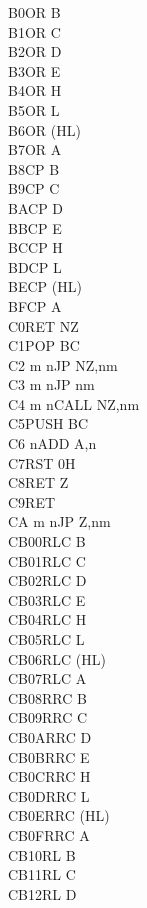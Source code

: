 \begin{multicols}{3}
{\begin{tabbing}
    B0\>OR B\\
    B1\>OR C\\
    B2\>OR D\\
    B3\>OR E\\
    B4\>OR H\\
    B5\>OR L\\
    B6\>OR (HL)\\
    B7\>OR A\\
    B8\>CP B\\
    B9\>CP C\\
    BA\>CP D\\
    BB\>CP E\\
    BC\>CP H\\
    BD\>CP L\\
    BE\>CP (HL)\\
    BF\>CP A\\
    C0\>RET NZ\\
    C1\>POP BC\\
    C2 m n\>JP NZ,nm\\
    C3 m n\>JP nm\\
    C4 m n\>CALL NZ,nm\\
    C5\>PUSH BC\\
    C6 n\>ADD A,n\\
    C7\>RST 0H\\
    C8\>RET Z\\
    C9\>RET\\
    CA m n\>JP Z,nm\\
    CB00\>RLC B\\
    CB01\>RLC C\\
    CB02\>RLC D\\
    CB03\>RLC E\\
    CB04\>RLC H\\
    CB05\>RLC L\\
    CB06\>RLC (HL)\\
    CB07\>RLC A\\
    CB08\>RRC B\\
    CB09\>RRC C\\
    CB0A\>RRC D\\
    CB0B\>RRC E\\
    CB0C\>RRC H\\
    CB0D\>RRC L\\
    CB0E\>RRC (HL)\\
    CB0F\>RRC A\\
    CB10\>RL B\\
    CB11\>RL C\\
    CB12\>RL D\\

\end{tabbing}}
\end{multicols}
